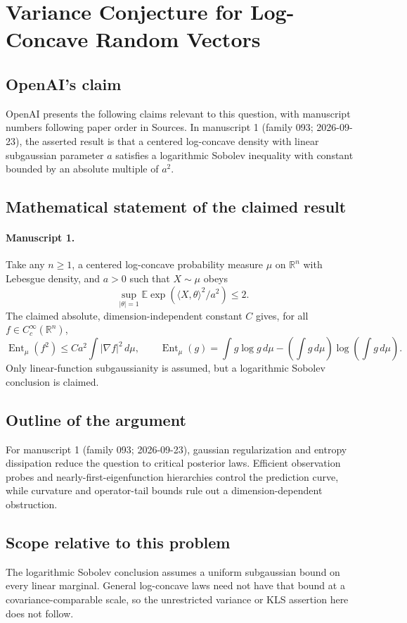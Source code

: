 \documentclass[11pt]{article}
\begin{document}
\section*{Variance Conjecture for Log-Concave Random Vectors}

\subsection{OpenAI's claim}
OpenAI presents the following claims relevant to this question, with manuscript numbers following paper order in Sources. In manuscript 1 (family 093; 2026-09-23), the asserted result is that a centered log-concave density with linear subgaussian parameter $a$ satisfies a logarithmic Sobolev inequality with constant bounded by an absolute multiple of $a^2$.

\subsection{Mathematical statement of the claimed result}
\paragraph{Manuscript 1.}
Take any $n\ge1$, a centered log-concave probability measure $\mu$ on $\mathbb R^n$ with Lebesgue density, and $a>0$ such that $X\sim\mu$ obeys
\[
 \sup_{|\theta|=1}\mathbb E\exp(\langle X,\theta\rangle^2/a^2)\le2.
\]
The claimed absolute, dimension-independent constant $C$ gives, for all $f\in C_c^{\infty}(\mathbb R^n)$,
\[
 \operatorname{Ent}_{\mu}(f^2)\le Ca^2\int|\nabla f|^2\,d\mu,
 \qquad \operatorname{Ent}_{\mu}(g)=\int g\log g\,d\mu-
 (\int g\,d\mu)\log(\int g\,d\mu).
\]
Only linear-function subgaussianity is assumed, but a logarithmic Sobolev conclusion is claimed.

\subsection{Outline of the argument}
For manuscript 1 (family 093; 2026-09-23), gaussian regularization and entropy dissipation reduce the question to critical posterior laws. Efficient observation probes and nearly-first-eigenfunction hierarchies control the prediction curve, while curvature and operator-tail bounds rule out a dimension-dependent obstruction.

\subsection{Scope relative to this problem}
The logarithmic Sobolev conclusion assumes a uniform subgaussian bound on every linear marginal. General log-concave laws need not have that bound at a covariance-comparable scale, so the unrestricted variance or KLS assertion here does not follow.
\end{document}

